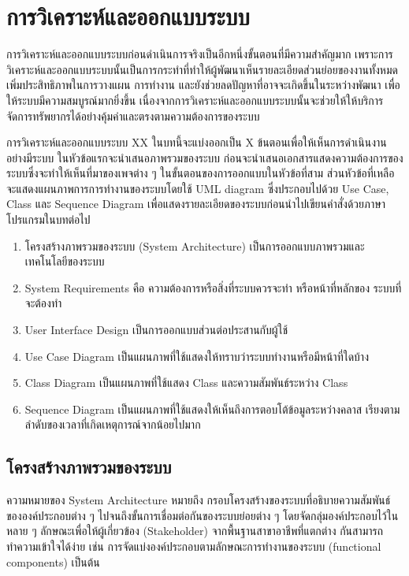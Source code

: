 \chapter{การวิเคราะห์และออกแบบระบบ}

การวิเคราะห์และออกแบบระบบก่อนดำเนินการจริงเป็นอีกหนึ่งขั้นตอนที่มีความสำคัญมาก เพราะการวิเคราะห์และออกแบบระบบนั้นเป็นการกระทำที่ทำให้ผู้พัฒนาเห็นรายละเอียดส่วนย่อยของงานทั้งหมด เพิ่มประสิทธิภาพในการวางแผน การทำงาน และยังช่วยลดปัญหาที่อาจจะเกิดขึ้นในระหว่างพัฒนา เพื่อให้ระบบมีความสมบูรณ์มากยิ่งขึ้น เนื่องจากการวิเคราะห์และออกแบบระบบนั้นจะช่วยให้ให้บริการ จัดการทรัพยากรได้อย่างคุ้มค่าและตรงตามความต้องการของระบบ

การวิเคราะห์และออกแบบระบบ XX ในบทนี้จะแบ่งออกเป็น X ข้นตอนเพื่อให้เห็นการดำเนินงานอย่างมีระบบ ในหัวข้อแรกจะนำเสนอภาพรวมของระบบ ก่อนจะนำเสนอเอกสารแสดงความต้องการของระบบซึ่งจะทำให้เห็นที่มาของเพจต่าง ๆ ในขั้นตอนของการออกแบบในหัวข้อที่สาม ส่วนหัวข้อที่เหลือจะแสดงแผนภาพการการทำงานของระบบโดยใช้ UML diagram ซึ่งประกอบไปด้วย Use Case, Class และ Sequence Diagram เพื่อแสดงรายละเอียดของระบบก่อนนำไปเขียนคำสั่งด้วยภาษาโปรแกรมในบทต่อไป

\begin{enumerate}[label=3.\arabic*]
	\item โครงสร้างภาพรวมของระบบ (System Architecture) เป็นการออกแบบภาพรวมและเทคโนโลยีของระบบ
	\item System Requirements คือ ความต้องการหรือสิ่งที่ระบบควรจะทำ หรือหน้าที่หลักของ
	ระบบที่จะต้องทำ
	\item User Interface Design เป็นการออกแบบส่วนต่อประสานกับผู้ใช้
	\item Use Case Diagram เป็นแผนภาพที่ใช้แสดงให้ทราบว่าระบบทำงานหรือมีหน้าที่ใดบ้าง
	\item Class Diagram เป็นแผนภาพที่ใช้แสดง Class และความสัมพันธ์ระหว่าง Class
	\item Sequence Diagram เป็นแผนภาพที่ใช้แสดงให้เห็นถึงการตอบโต้ข้อมูลระหว่างคลาส เรียงตามลำดับของเวลาที่เกิดเหตุการณ์จากน้อยไปมาก
\end{enumerate}	

\section{โครงสร้างภาพรวมของระบบ}
    ความหมายของ System Architecture \cite{architecture} หมายถึง กรอบโครงสร้างของระบบที่อธิบายความสัมพันธ์ขององค์ประกอบต่าง ๆ ไปจนถึงขั้นการเชื่อมต่อกันของระบบย่อยต่าง ๆ โดยจัดกลุ่มองค์ประกอบไว้ในหลาย ๆ ลักษณะเพื่อให้ผู้เกี่ยวข้อง (Stakeholder) จากพื้นฐานสาขาอาชีพที่แตกต่าง กันสามารถทำความเข้าใจได้ง่าย เช่น การจัดแบ่งองค์ประกอบตามลักษณะการทำงานของระบบ (functional components) เป็นต้น
    
